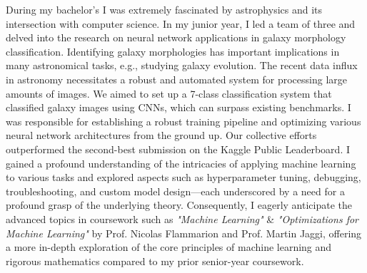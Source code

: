\documentclass{article}
\begin{document}
\hspace{0.25in}During my bachelor's I was extremely fascinated by astrophysics
and its intersection with computer science. In my junior year, I led a team of
three and delved into the research on neural network applications in galaxy
morphology classification. Identifying galaxy morphologies has important
implications in many astronomical tasks, e.g., studying galaxy evolution. The
recent data influx in astronomy necessitates a robust and automated system for
processing large amounts of images. We aimed to set up a 7-class classification
system that classified galaxy images using CNNs, which can surpass existing
benchmarks. I was responsible for establishing a robust training pipeline and
optimizing various neural network architectures from the ground up. Our
collective efforts outperformed the second-best submission on the Kaggle Public
Leaderboard. I gained a profound understanding of the intricacies of applying
machine learning to various tasks and explored aspects such as hyperparameter
tuning, debugging, troubleshooting, and custom model design—each underscored by
a need for a profound grasp of the underlying theory. Consequently, I eagerly
anticipate the advanced topics in coursework such as \textit{"Machine Learning"} \&
\textit{"Optimizations for Machine Learning"} by Prof. Nicolas Flammarion and Prof.
Martin Jaggi, offering a more in-depth exploration of the core principles of
machine learning and rigorous mathematics compared to my prior senior-year
coursework. 
\vspace{3pt}
\end{document}
